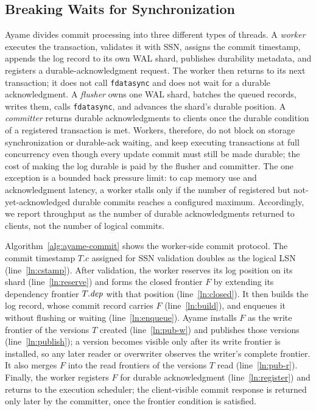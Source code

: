 \subsection{Breaking Waits for Synchronization}
\label{sec:pipeline}
Ayame divides commit processing into three different types of threads.
%
A \emph{worker} executes the transaction, validates it with SSN, assigns the commit timestamp, appends the log record to its own WAL shard, publishes durability metadata, and registers a durable-acknowledgment request.
%
The worker then returns to its next transaction; it does not call \texttt{fdatasync} and does not wait for a durable acknowledgment.  
%
A \emph{flusher} owns one WAL shard, batches the queued records, writes them, calls \texttt{fdatasync}, and advances the shard's durable position.  
%
A \emph{committer} returns durable acknowledgments to clients once the durable condition of a registered transaction is met.  
%
Workers, therefore, do not block on storage synchronization or durable-ack waiting, and keep executing transactions at full concurrency even though every update commit must still be made durable; the cost of making the log durable is paid by the flusher and committer.  The one exception is a bounded back pressure limit: to cap memory use and acknowledgment latency, a worker stalls only if the number of registered but not-yet-acknowledged durable commits reaches a configured maximum. 
%
Accordingly, we report throughput as the number of durable acknowledgments returned to clients, not the number of logical commits.

Algorithm~\ref{alg:ayame-commit} shows the worker-side commit protocol. The commit timestamp $T.c$ assigned for SSN validation doubles as the logical LSN (line~\ref{ln:cstamp}).  After validation, the worker reserves its log position on its shard (line~\ref{ln:reserve}) and forms the closed frontier $F$ by extending its dependency frontier $T.\mathit{dep}$ with that position (line~\ref{ln:closed}).  It then builds the log record, whose commit record carries $F$ (line~\ref{ln:build}), and enqueues it without flushing or waiting (line~\ref{ln:enqueue}).  
%
Ayame installs $F$ as the write frontier of the versions $T$ created (line~\ref{ln:pub-w}) and publishes those versions (line~\ref{ln:publish}); a version becomes visible only after its write frontier is installed, so any later reader or overwriter observes the writer's complete frontier.  It also merges $F$ into the read frontiers
of the versions $T$ read (line~\ref{ln:pub-r}).  
%
Finally, the worker registers $F$ for durable acknowledgment (line~\ref{ln:register}) and returns to the execution scheduler; the client-visible commit response is returned only later by the committer, once the frontier condition is satisfied.

